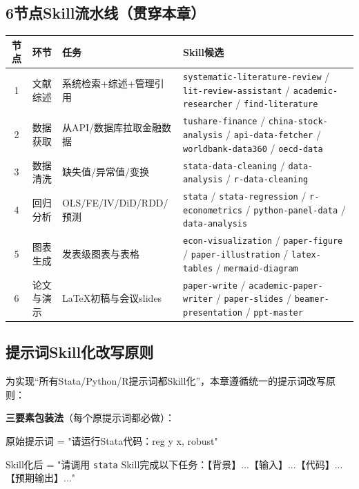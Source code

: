 \subsection{6节点Skill流水线（贯穿本章）}

\begin{table}[H]
\centering
\begin{tabular}{clp{6cm}p{4.5cm}}
\toprule
\textbf{节点} & \textbf{环节} & \textbf{任务} & \textbf{Skill候选} \\
\midrule
1 & 文献综述 & 系统检索+综述+管理引用 & \texttt{systematic-literature-review} / \texttt{lit-review-assistant} / \texttt{academic-researcher} / \texttt{find-literature} \\
2 & 数据获取 & 从API/数据库拉取金融数据 & \texttt{tushare-finance} / \texttt{china-stock-analysis} / \texttt{api-data-fetcher} / \texttt{worldbank-data360} / \texttt{oecd-data} \\
3 & 数据清洗 & 缺失值/异常值/变换 & \texttt{stata-data-cleaning} / \texttt{data-analysis} / \texttt{r-data-cleaning} \\
4 & 回归分析 & OLS/FE/IV/DiD/RDD/预测 & \texttt{stata} / \texttt{stata-regression} / \texttt{r-econometrics} / \texttt{python-panel-data} / \texttt{data-analysis} \\
5 & 图表生成 & 发表级图表与表格 & \texttt{econ-visualization} / \texttt{paper-figure} / \texttt{paper-illustration} / \texttt{latex-tables} / \texttt{mermaid-diagram} \\
6 & 论文与演示 & LaTeX初稿与会议slides & \texttt{paper-write} / \texttt{academic-paper-writer} / \texttt{paper-slides} / \texttt{beamer-presentation} / \texttt{ppt-master} \\
\bottomrule
\end{tabular}
\end{table}

\subsection{提示词Skill化改写原则}

为实现“所有Stata/Python/R提示词都Skill化”，本章遵循统一的提示词改写原则：

\textbf{三要素包装法}（每个原提示词都必做）：

原始提示词 = "请运行Stata代码：reg y x, robust"

Skill化后 = "请调用 \texttt{stata} Skill完成以下任务：【背景】...【输入】...【代码】...【预期输出】..."

